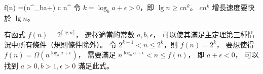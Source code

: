 \startsplitformula\startmathalignment
\NC f(n) \NC =\Omega(n^{\log_b{a+\epsilon}}) \NR
\NC \NC \ge c n^{\lg\epsilon} \NR
\stopmathalignment\stopsplitformula
令 $k=\log_b{a+\epsilon}>0$，即 $\lg n \ge c n^k$。
 $cn^k$ 增長速度要快於 $\lg n$。
\stopANSWER

\startEXERCISE
有函式 $f(n)=2^{\lceil \lg n\rceil}$，
選擇適當的常數 $a,b,\epsilon$，
可以使其滿足主定理第三種情況中所有條件（規則條件除外）。
\stopEXERCISE
\startANSWER
令 $2^{k-1}< n\le 2^{k}$，則 $f(n)=2^k$，
要想使得 $f(n)=\Omega(n^{\log_b{a+\epsilon}})$，
需要滿足 $n^{\log_b{a+\epsilon}} < n\le f(n)$，
即 $a+\epsilon < 0$，
可以找到 $a>0,b>1,\epsilon>0$ 滿足此式。
\stopANSWER

\stopsection
